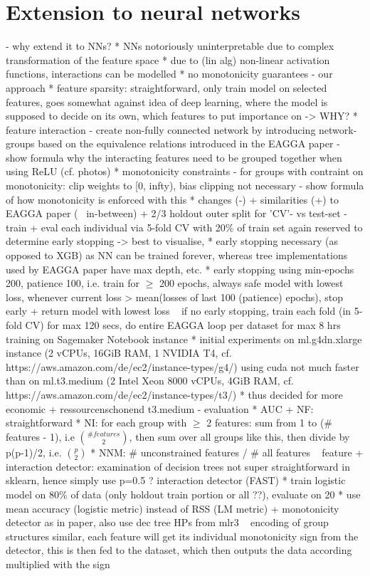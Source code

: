 \documentclass[twoside,11pt]{article}
\begin{document}
\section{Extension to neural networks}
- why extend it to NNs?
  * NNs notoriously uninterpretable due to complex transformation of the feature space
  * due to (lin alg) non-linear activation functions, interactions can be modelled
  * no monotonicity guarantees
- our approach
  * feature sparsity: straightforward, only train model on selected features, goes somewhat against idea of deep learning,
    where the model is supposed to decide on its own, which features to put importance on -> WHY?
  * feature interaction
    - create non-fully connected network by introducing network-groups based on the equivalence relations introduced in the EAGGA paper
    - show formula why the interacting features need to be grouped together when using ReLU (cf. photos)
  * monotonicity constraints
    - for groups with contraint on monotonicity: clip weights to [0, infty), bias clipping not necessary
    - show formula of how monotonicity is enforced with this
  * changes (-) + similarities (+) to EAGGA paper (~ in-between)
    + 2/3 holdout outer split for 'CV'- vs test-set
    - train + eval each individual via 5-fold CV with 20\% of train set again reserved to determine early stopping -> best to visualise,
      * early stopping necessary (as opposed to XGB) as NN can be trained forever, whereas tree implementations used by EAGGA paper have
        max depth, etc.
      * early stopping using min-epochs 200, patience 100, i.e. train for $\ge$ 200 epochs, always safe model with lowest loss, whenever
        current loss > mean(losses of last 100 (patience) epochs), stop early + return model with lowest loss
    ~ if no early stopping, train each fold (in 5-fold CV) for max 120 secs, do entire EAGGA loop per dataset for max 8 hrs
    ~ training on Sagemaker Notebook instance
      * initial experiments on ml.g4dn.xlarge instance (2 vCPUs, 16GiB RAM, 1 NVIDIA T4, cf. https://aws.amazon.com/de/ec2/instance-types/g4/)
      using cuda not much faster than on ml.t3.medium (2 Intel Xeon 8000 vCPUs, 4GiB RAM, cf. https://aws.amazon.com/de/ec2/instance-types/t3/)
      * thus decided for more economic + ressourcenschonend t3.medium
    - evaluation
      * AUC + NF: straightforward
      * NI: for each group with $\ge$ 2 features: sum from 1 to (\# features - 1), i.e ${\# features \choose 2}$,
        then sum over all groups like this, then divide by p(p-1)/2, i.e. ${p \choose 2}$
      * NNM: \# unconstrained features / \# all features
    ~ feature + interaction detector: examination of decision trees not super straightforward in sklearn, hence simply use p=0.5
    ? interaction detector (FAST)
      * train logistic model on 80\% of data (only holdout train portion or all ??), evaluate on 20
      * use mean accuracy (logistic metric) instead of RSS (LM metric)
    + monotonicity detector as in paper, also use dec tree HPs from mlr3
    ~ encoding of group structures similar, each feature will get its individual monotonicity sign from the detector, this is then fed to the dataset,
      which then outputs the data according multiplied with the sign
\end{document}
